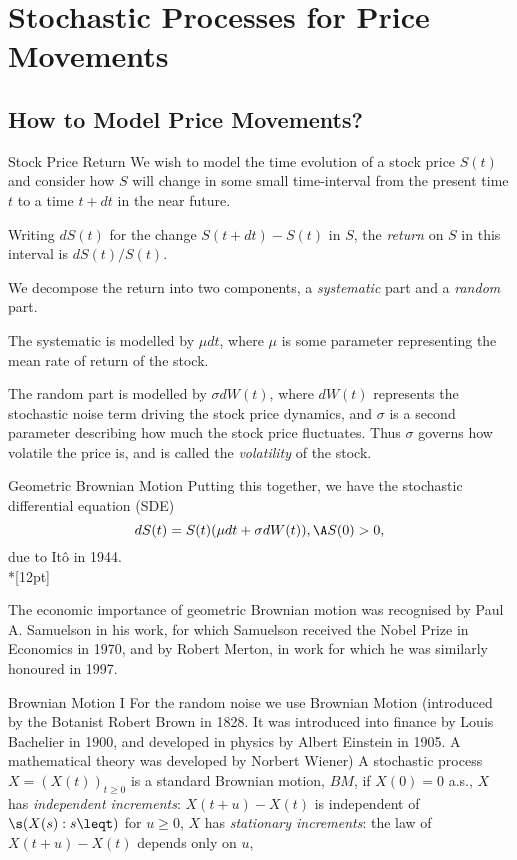\section{Stochastic Processes for Price Movements}

\subsection{How to Model Price Movements?}

Stock Price Return
	We wish to model the time evolution of a stock price
	$S(t)$ and consider how $S$ will change in some small time-interval from the present time $t$
	to a time $t+dt$ in the near future.
 
	Writing $dS(t)$ for the
	change $S(t+dt)-S(t)$ in $S$, the {\it return} on $S$ in this
	interval is $dS(t)/S(t)$.
	
	We decompose the return into two components, a {\it systematic}
	part and a {\it random} part.
	
	The systematic is modelled by $\mu dt$, where $\mu$ is some parameter
	representing the mean rate of return of the stock.

	The random part is modelled by $\sigma dW(t)$, where $dW(t)$
	represents the stochastic noise term driving the stock price dynamics, and
	$\sigma$ is a second parameter describing how much the stock price fluctuates. Thus $\sigma$
	governs how volatile the price is, and is called the {\it volatility} of the stock.


Geometric Brownian Motion
Putting this together, we have the stochastic differential
equation (SDE)
	\begin{equation}\label{GBM}
	dS(t) = S(t) (\mu dt + \sigma dW(t)), \A S(0) > 0,
	\end{equation}
due to It\^{o} in 1944.\\*[12pt]

The economic importance of geometric
Brownian motion was recognised by Paul A. Samuelson in his work, for which Samuelson received the Nobel
Prize in Economics in 1970, and by Robert Merton, in work for which he was similarly
honoured in 1997.


Brownian Motion I
	For the random noise we use Brownian Motion (introduced by the Botanist Robert Brown in
	1828. It was introduced into finance by Louis Bachelier in 1900, and developed in physics by Albert Einstein in 1905.
	A mathematical theory was developed by Norbert Wiener)
	A stochastic process $X=(X(t))_{t \geq 0}$ is a standard
	Brownian motion, $BM$, if
	$X(0) = 0$ a.s., 
	$X$ has {\it independent increments}: $X(t+u) - X(t)$ is independent of $\s (X(s): s \leqt)$ for $u \geq 0$, 
	$X$ has {\it stationary increments}: the law of $X(t+u) - X(t)$ depends only on $u$,

